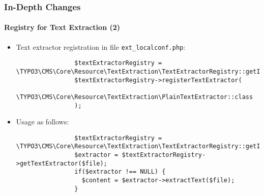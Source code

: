 \begin{frame}[fragile]
	\frametitle{In-Depth Changes}
	\framesubtitle{Registry for Text Extraction (2)}

	\lstset{basicstyle=\tiny\ttfamily}

	\begin{itemize}

		\item Text extractor registration in file \texttt{ext\_localconf.php}:

			\begin{lstlisting}
				$textExtractorRegistry = \TYPO3\CMS\Core\Resource\TextExtraction\TextExtractorRegistry::getInstance();
				$textExtractorRegistry->registerTextExtractor(
				  \TYPO3\CMS\Core\Resource\TextExtraction\PlainTextExtractor::class
				);
			\end{lstlisting}

		\item Usage as follows:

			\begin{lstlisting}
				$textExtractorRegistry = \TYPO3\CMS\Core\Resource\TextExtraction\TextExtractorRegistry::getInstance();
				$extractor = $textExtractorRegistry->getTextExtractor($file);
				if($extractor !== NULL) {
				  $content = $extractor->extractText($file);
				}
			\end{lstlisting}
	\end{itemize}

\end{frame}


